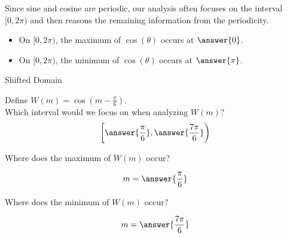 \documentclass{ximera}
\author{Lee Wayand}
\begin{document}
\begin{exercise}





Since sine and cosine are periodic, our analysis often focuses on the interval $[0, 2\pi)$ and then reasons the remaining information from the periodicity.  \\

\begin{itemize}
\item On $[0, 2\pi)$, the maximum of $\cos(\theta)$ occurs at $\answer{0}$. 
\item On $[0, 2\pi)$, the minimum of $\cos(\theta)$ occurs at $\answer{\pi}$. 
\end{itemize}










\begin{question} Shifted Domain 

Define $W(m) = \cos\left(m - \frac{\pi}{6} \right)$. \\




Which interval would we focus on when analyzing $W(m)$? \\

\[
\left[      \answer{\frac{\pi}{6}},   \answer{\frac{7\pi}{6}}     \right)
\]




Where does the maximum of $W(m)$ occur?

\[
m = \answer{\frac{\pi}{6}} 
\]





Where does the minimum of $W(m)$ occur?

\[
m = \answer{\frac{7\pi}{6}} 
\]



\end{question}


















\end{exercise}
\end{document}
